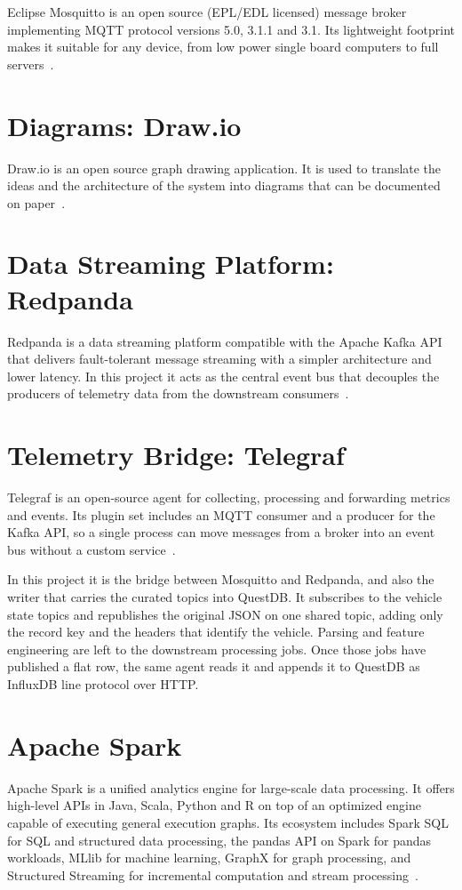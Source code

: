 Eclipse Mosquitto is an open source (EPL/EDL licensed) message broker implementing MQTT protocol versions 5.0, 3.1.1 and 3.1. Its lightweight footprint makes it suitable for any device, from low power single board computers to full servers~\cite{eclipse_mosquitto}.

\section{Diagrams: Draw.io}
Draw.io is an open source graph drawing application. It is used to translate the ideas and the architecture of the system into diagrams that can be documented on paper~\cite{drawio}.

\section{Data Streaming Platform: Redpanda}
Redpanda is a data streaming platform compatible with the Apache Kafka API\cite{kafka_api} that delivers fault-tolerant message streaming with a simpler architecture and lower latency. In this project it acts as the central event bus that decouples the producers of telemetry data from the downstream consumers~\cite{redpanda}.

\section{Telemetry Bridge: Telegraf}
Telegraf is an open-source agent for collecting, processing and forwarding metrics and events. Its plugin set includes an MQTT consumer and a producer for the Kafka API, so a single process can move messages from a broker into an event bus without a custom service~\cite{telegraf}.

In this project it is the bridge between Mosquitto and Redpanda, and also the writer that carries the curated topics into QuestDB. It subscribes to the vehicle state topics and republishes the original JSON on one shared topic, adding only the record key and the headers that identify the vehicle. Parsing and feature engineering are left to the downstream processing jobs. Once those jobs have published a flat row, the same agent reads it and appends it to QuestDB as InfluxDB line protocol over HTTP.

\section{Apache Spark}
Apache Spark is a unified analytics engine for large-scale data processing. It offers high-level APIs in Java, Scala, Python and R on top of an optimized engine capable of executing general execution graphs. Its ecosystem includes Spark SQL for SQL and structured data processing, the pandas API on Spark for pandas workloads, MLlib for machine learning, GraphX for graph processing, and Structured Streaming for incremental computation and stream processing~\cite{apache_spark}.


